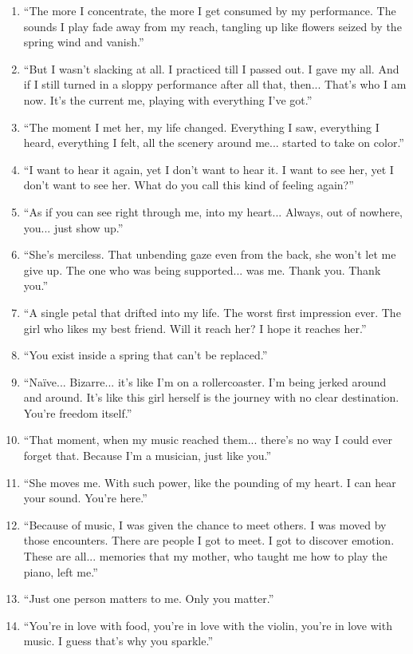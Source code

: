 \documentclass{book}
\numberwithin{equation}{section}
\begin{document}
\begin{enumerate}
    \item ``The more I concentrate, the more I get consumed by my performance. The sounds I play fade away from my reach, tangling up like flowers seized by the spring wind and vanish.''
    \item ``But I wasn't slacking at all. I practiced till I passed out. I gave my all. And if I still turned in a sloppy performance after all that, then... That's who I am now. It's the current me, playing with everything I've got.''
    \item ``The moment I met her, my life changed. Everything I saw, everything I heard, everything I felt, all the scenery around me... started to take on color.''
    \item ``I want to hear it again, yet I don't want to hear it. I want to see her, yet I don't want to see her. What do you call this kind of feeling again?''
    \item ``As if you can see right through me, into my heart... Always, out of nowhere, you... just show up.''
    \item ``She's merciless. That unbending gaze even from the back, she won't let me give up. The one who was being supported... was me. Thank you. Thank you.''
    \item ``A single petal that drifted into my life. The worst first impression ever. The girl who likes my best friend. Will it reach her? I hope it reaches her.''
    \item ``You exist inside a spring that can't be replaced.''
    \item ``Naïve... Bizarre... it's like I'm on a rollercoaster. I'm being jerked around and around. It's like this girl herself is the journey with no clear destination. You're freedom itself.''
    \item ``That moment, when my music reached them... there's no way I could ever forget that. Because I'm a musician, just like you.''
    \item ``She moves me. With such power, like the pounding of my heart. I can hear your sound. You're here.''
    \item ``Because of music, I was given the chance to meet others. I was moved by those encounters. There are people I got to meet. I got to discover emotion. These are all... memories that my mother, who taught me how to play the piano, left me.''
    \item ``Just one person matters to me. Only you matter.''
    \item ``You're in love with food, you're in love with the violin, you're in love with music. I guess that's why you sparkle.''

\end{enumerate}
\end{document}
